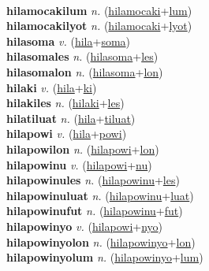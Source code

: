  \label{hilamocakiles} \\
\textbf{hilamocakilum} \textit{n.} (\hyperref[hilamocaki]{hilamocaki}+\hyperref[lum]{lum})
 \label{hilamocakilum} \\
\textbf{hilamocakilyot} \textit{n.} (\hyperref[hilamocaki]{hilamocaki}+\hyperref[lyot]{lyot})
 \label{hilamocakilyot} \\
\textbf{hilasoma} \textit{v.} (\hyperref[hila]{hila}+\hyperref[soma]{soma})
 \label{hilasoma} \\
\textbf{hilasomales} \textit{n.} (\hyperref[hilasoma]{hilasoma}+\hyperref[les]{les})
 \label{hilasomales} \\
\textbf{hilasomalon} \textit{n.} (\hyperref[hilasoma]{hilasoma}+\hyperref[lon]{lon})
 \label{hilasomalon} \\
\textbf{hilaki} \textit{v.} (\hyperref[hila]{hila}+\hyperref[ki]{ki})
 \label{hilaki} \\
\textbf{hilakiles} \textit{n.} (\hyperref[hilaki]{hilaki}+\hyperref[les]{les})
 \label{hilakiles} \\
\textbf{hilatiluat} \textit{n.} (\hyperref[hila]{hila}+\hyperref[tiluat]{tiluat})
 \label{hilatiluat} \\
\textbf{hilapowi} \textit{v.} (\hyperref[hila]{hila}+\hyperref[powi]{powi})
 \label{hilapowi} \\
\textbf{hilapowilon} \textit{n.} (\hyperref[hilapowi]{hilapowi}+\hyperref[lon]{lon})
 \label{hilapowilon} \\
\textbf{hilapowinu} \textit{v.} (\hyperref[hilapowi]{hilapowi}+\hyperref[nu]{nu})
 \label{hilapowinu} \\
\textbf{hilapowinules} \textit{n.} (\hyperref[hilapowinu]{hilapowinu}+\hyperref[les]{les})
 \label{hilapowinules} \\
\textbf{hilapowinuluat} \textit{n.} (\hyperref[hilapowinu]{hilapowinu}+\hyperref[luat]{luat})
 \label{hilapowinuluat} \\
\textbf{hilapowinufut} \textit{n.} (\hyperref[hilapowinu]{hilapowinu}+\hyperref[fut]{fut})
 \label{hilapowinufut} \\
\textbf{hilapowinyo} \textit{v.} (\hyperref[hilapowi]{hilapowi}+\hyperref[nyo]{nyo})
 \label{hilapowinyo} \\
\textbf{hilapowinyolon} \textit{n.} (\hyperref[hilapowinyo]{hilapowinyo}+\hyperref[lon]{lon})
 \label{hilapowinyolon} \\
\textbf{hilapowinyolum} \textit{n.} (\hyperref[hilapowinyo]{hilapowinyo}+\hyperref[lum]{lum})
 \label{hilapowinyolum} \\
